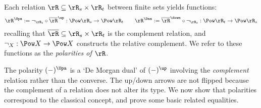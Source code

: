 \documentclass{article}
\begin{document}
\begin{definition}[Polarities]
  \label{def:polarities}
  Each relation $\rR \subseteq \rR_s \times \rR_t$ between finite sets yields functions:
  \[
  \rR^\Upa := \neg_{\rR_t} \circ \overline{\rR}^\up : \Pow \rR_s \to \Pow \rR_t
  \qquad
  \rR^\Dna := \overline{\rR}^\down \circ \neg_{\rR_t} : \Pow \rR_t \to \Pow \rR_s
  \]
  recalling that $\overline{\rR} \subseteq \rR_s \times \rR_t$ is the complement relation, and $\neg_X : \Pow X \to \Pow X$ constructs the relative complement.  We refer to these functions as the \emph{polarities of $\rR$}. \endbox
  \end{definition}
  
  The polarity $(-)^\Upa$ is a `De Morgan dual' of $(-)^\up$ involving the \emph{complement} relation rather than the converse. The up/down arrows are not flipped because the complement of a relation does not alter its type. We now show that polarities correspond to the classical concept, and prove some basic related equalities.
  
\end{document}
